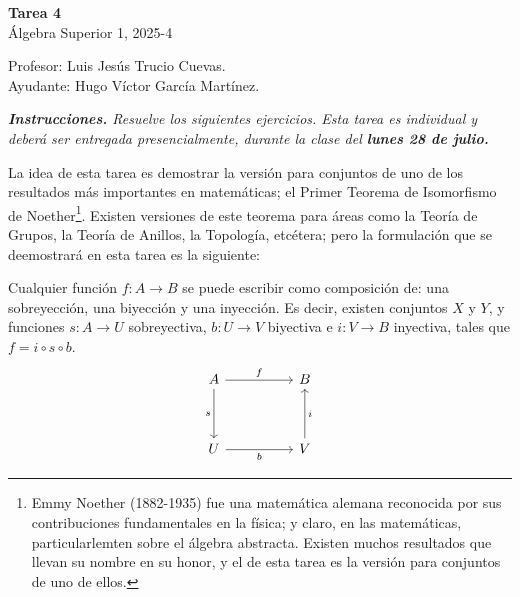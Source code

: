 \documentclass[letterpaper,DIV=14,headsepline,12pt]{scrartcl}
\begin{document}
    \begin{center}
        {\fontsize{30}{60}\rmfamily \textbf{Tarea 4}} \\ \vspace{.2cm}
        Álgebra Superior 1, 2025-4
    \end{center}
    \begin{flushright}
        \footnotesize \hfill Profesor: Luis Jesús Trucio Cuevas.\\
        \hfill Ayudante: Hugo Víctor García Martínez.
    \end{flushright}

    \noindent\textit{\textbf{Instrucciones.} Resuelve los siguientes ejercicios. Esta tarea es individual y deberá ser entregada presencialmente, durante la clase del \textbf{lunes 28 de julio.} \vspace{.4cm}}

    La idea de esta tarea es demostrar la versión para conjuntos de uno de los resultados más importantes en matemáticas; el Primer Teorema de Isomorfismo de Noether\footnote{Emmy Noether (1882-1935) fue una matemática alemana reconocida por sus contribuciones fundamentales en la física; y claro, en las matemáticas, particularlemten sobre el álgebra abstracta. Existen muchos resultados que llevan su nombre en su honor, y el de esta tarea es la versión para conjuntos de uno de ellos.}. Existen versiones de este teorema para áreas como la Teoría de Grupos, la Teoría de Anillos, la Topología, etcétera; pero la formulación que se deemostrará en esta tarea es la siguiente:

    \begin{teorema}\label{teo:primero}
        Cualquier función $f:A \to B$ se puede escribir como composición de: una sobreyección, una biyección y una inyección. Es decir, existen conjuntos $X$ y $Y$, y funciones $s:A \to U$ sobreyectiva, $b:U \to V$ biyectiva e $i:V \to B$ inyectiva, tales que $f = i \circ s \circ b$.
        \begin{equation}\label{eq:obj}
            \begin{tikzcd}
            A && B \\
            \\
            U && V
            \arrow["f", from=1-1, to=1-3]
            \arrow["s"', from=1-1, to=3-1]
            \arrow["b"', from=3-1, to=3-3]
            \arrow["i"', from=3-3, to=1-3]
        \end{tikzcd}
        \end{equation}
    \end{teorema}
\end{document}
